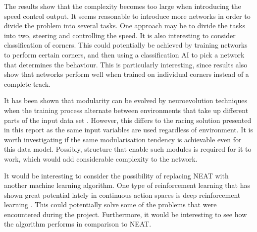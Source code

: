 The results show that the complexity becomes too large when introducing the speed control output. It seems reasonable to introduce more networks in order to divide the problem into several tasks. One approach may be to divide the tasks into two, steering and controlling the speed. It is also interesting to consider classification of corners. This could potentially be achieved by training networks to perform certain corners, and then using a classification AI to pick a network that determines the behaviour. This is particularly interesting, since results also show that networks perform well when trained on individual corners instead of a complete track.


It has been shown that modularity can be evolved by neuroevolution techniques when the training process alternate between environments that take up different parts of the input data set \cite{ellefsen2015neural}. However, this differs to the racing solution presented in this report as the same input variables are used regardless of environment. It is worth investigating if the same modularisation tendency is achievable even for this data model. Possibly, structure that enable such modules is required for it to work, which would add considerable complexity to the network.

It would be interesting to consider the possibility of replacing NEAT with another machine learning algorithm. One type of reinforcement learning that has shown great potential lately in continuous action spaces is deep reinforcement learning \cite{lillicrap2015continuous}. This could potentially solve some of the problems that were encountered during the project. Furthermore, it would be interesting to see how the algorithm performs in comparison to NEAT.







